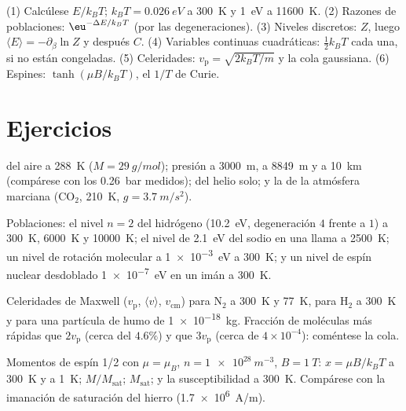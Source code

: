 \begin{method}\label{meth:b2:boltzmann-factor:method}
(1) Calcúlese $E/k_BT$; $k_BT = \qty{0.026}{eV}$ a \qty{300}{K} y \qty{1}{eV}
a \qty{11600}{K}. (2) Razones de poblaciones: $\eu^{-\Delta E/k_BT}$ (por las
degeneraciones). (3) Niveles discretos: $Z$, luego $\langle E\rangle =
-\partial_\beta\ln Z$ y después $C$. (4) Variables continuas cuadráticas:
$\tfrac12k_BT$ cada una, si no están congeladas. (5) Celeridades: $v_{\text{p}} = \sqrt{2k_BT/m}$
y la cola gaussiana. (6) Espines: $\tanh(\mu B/k_BT)$, el $1/T$ de Curie.
\end{method}

\section{Ejercicios}

\begin{exercise}[$\star$]\label{exo:b2:boltzmann-factor:1}
 del aire a \qty{288}{K} ($M = \qty{29}{g/mol}$); presión a
\qty{3000}{m}, a \qty{8849}{m} y a \qty{10}{km} (compárese con los \qty{0.26}{bar}
medidos);  del helio solo; y la de la atmósfera marciana
(CO$_2$, \qty{210}{K}, $g = \qty{3.7}{m/s^2}$).
\end{exercise}

\begin{exercise}[$\star$]\label{exo:b2:boltzmann-factor:2}
Poblaciones: el nivel $n = 2$ del hidrógeno (\qty{10.2}{eV}, degeneración $4$
frente a $1$) a \qty{300}{K}, \qty{6000}{K} y \qty{10000}{K}; el nivel de
\qty{2.1}{eV} del sodio en una llama a \qty{2500}{K}; un nivel de rotación molecular a
\qty{1e-3}{eV} a \qty{300}{K}; y un nivel de espín nuclear desdoblado \qty{1e-7}{eV} en
un imán a \qty{300}{K}.
\end{exercise}

\begin{exercise}[$\star$]\label{exo:b2:boltzmann-factor:3}
Celeridades de Maxwell ($v_{\text{p}}$, $\langle v\rangle$, $v_{\text{cm}}$) para N$_2$
a \qty{300}{K} y \qty{77}{K}, para H$_2$ a \qty{300}{K} y para una partícula
de humo de \qty{1e-18}{kg}. Fracción de moléculas más rápidas que $2v_{\text{p}}$
(cerca del $4.6\%$) y que $3v_{\text{p}}$ (cerca de $4 \times 10^{-4}$): coméntese
la cola.
\end{exercise}

\begin{exercise}[$\star$]\label{exo:b2:boltzmann-factor:4}
Momentos de espín 1/2 con $\mu = \mu_B$, $n = \qty{1e28}{m^{-3}}$, $B = \qty{1}{T}$:
$x = \mu B/k_BT$ a \qty{300}{K} y a \qty{1}{K}; $M/M_{\text{sat}}$; $M_{\text{sat}}$;
y la susceptibilidad a \qty{300}{K}. Compárese con la imanación de saturación
del hierro (\qty{1.7e6}{A/m}).
\end{exercise}

